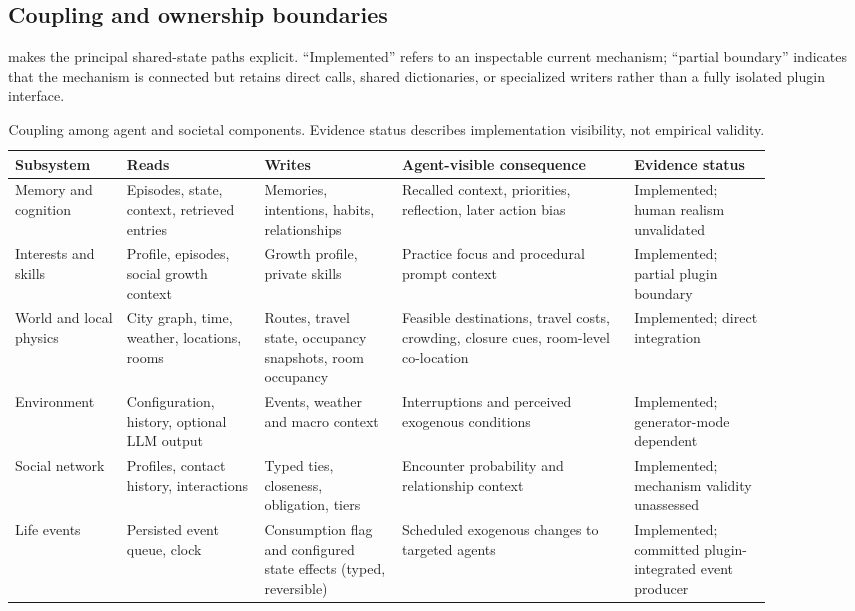\subsection{Coupling and ownership boundaries}

 makes the principal shared-state paths
explicit.  ``Implemented'' refers to an inspectable current mechanism;
``partial boundary'' indicates that the mechanism is connected but retains
direct calls, shared dictionaries, or specialized writers rather than a
fully isolated plugin interface.

\begin{table}[t]
\centering
\small
\setlength{\tabcolsep}{3.5pt}
\caption{Coupling among agent and societal components.  Evidence status
describes implementation visibility, not empirical validity.}
\label{tab:component-coupling}
\begin{tabular}{@{}p{0.13\linewidth}p{0.16\linewidth}p{0.16\linewidth}p{0.27\linewidth}p{0.16\linewidth}@{}}
\toprule
Subsystem & Reads & Writes & Agent-visible consequence & Evidence status \\
\midrule
Memory and cognition & Episodes, state, context, retrieved entries & Memories, intentions, habits, relationships & Recalled context, priorities, reflection, later action bias & Implemented; human realism unvalidated \\
Interests and skills & Profile, episodes, social growth context & Growth profile, private skills & Practice focus and procedural prompt context & Implemented; partial plugin boundary \\
World and local physics & City graph, time, weather, locations, rooms & Routes, travel state, occupancy snapshots, room occupancy & Feasible destinations, travel costs, crowding, closure cues, room-level co-location & Implemented; direct integration \\
Environment & Configuration, history, optional LLM output & Events, weather and macro context & Interruptions and perceived exogenous conditions & Implemented; generator-mode dependent \\
Social network & Profiles, contact history, interactions & Typed ties, closeness, obligation, tiers & Encounter probability and relationship context & Implemented; mechanism validity unassessed \\
Life events & Persisted event queue, clock & Consumption flag and configured state effects (typed, reversible) & Scheduled exogenous changes to targeted agents & Implemented; committed plugin-integrated event producer \\

\end{tabular}
\end{table}
